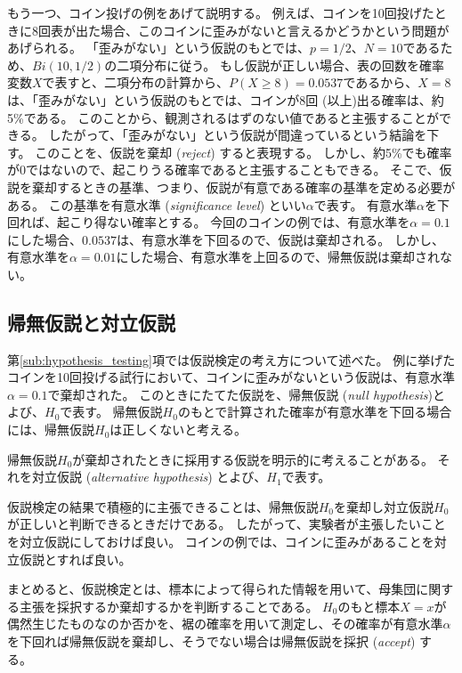 \documentclass[titlepage,12pt]{jreport}
\begin{document}
もう一つ、コイン投げの例をあげて説明する。 例えば、コインを10回投げたときに8回表が出た場合、このコインに歪みがないと言えるかどうかという問題があげられる。 「歪みがない」という仮説のもとでは、$p = 1 / 2$、$N = 10$であるため、$Bi(10, 1/2)$の二項分布に従う。 もし仮説が正しい場合、表の回数を確率変数$X$で表すと、二項分布の計算から、$P(X \geq 8) = 0.0537$であるから、$X = 8$は、「歪みがない」という仮説のもとでは、コインが8回 (以上)出る確率は、約5\%である。 このことから、観測されるはずのない値であると主張することができる。 したがって、「歪みがない」という仮説が間違っているという結論を下す。 このことを、仮説を棄却 ({\it reject}) すると表現する。 しかし、約5\%でも確率が0ではないので、起こりうる確率であると主張することもできる。 そこで、仮説を棄却するときの基準、つまり、仮説が有意である確率の基準を定める必要がある。 この基準を有意水準 ({\it significance level}) といい$\alpha$で表す。 有意水準$\alpha$を下回れば、起こり得ない確率とする。 今回のコインの例では、有意水準を$\alpha = 0.1$にした場合、$0.0537$は、有意水準を下回るので、仮説は棄却される。 しかし、有意水準を$\alpha = 0.01$にした場合、有意水準を上回るので、帰無仮説は棄却されない。



\subsection{帰無仮説と対立仮説\label{null-hypothesis}}
第\ref{sub:hypothesis_testing}項では仮説検定の考え方について述べた。 例に挙げたコインを10回投げる試行において、コインに歪みがないという仮説は、有意水準$\alpha = 0.1$で棄却された。 このときにたてた仮説を、帰無仮説 ({\it null hypothesis})とよび、$H_{0}$で表す。 帰無仮説$H_{0}$のもとで計算された確率が有意水準を下回る場合には、帰無仮説$H_{0}$は正しくないと考える。

帰無仮説$H_{0}$が棄却されたときに採用する仮説を明示的に考えることがある。 それを対立仮説 ({\it alternative hypothesis}) とよび、$H_{1}$で表す。 

仮説検定の結果で積極的に主張できることは、帰無仮説$H_{0}$を棄却し対立仮説$H_{0}$が正しいと判断できるときだけである。 したがって、実験者が主張したいことを対立仮説にしておけば良い。 コインの例では、コインに歪みがあることを対立仮説とすれば良い。

まとめると、仮説検定とは、標本によって得られた情報を用いて、母集団に関する主張を採択するか棄却するかを判断することである。 $H_{0}$のもと標本$X = x$が偶然生じたものなのか否かを、裾の確率を用いて測定し、その確率が有意水準$\alpha$を下回れば帰無仮説を棄却し、そうでない場合は帰無仮説を採択 ({\it accept}) する。
\end{document}
